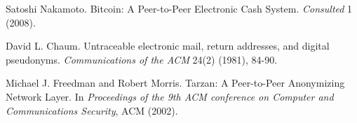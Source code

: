 \documentclass[conference]{IEEEtran}
\begin{document}
\begin{thebibliography}{1}

 Satoshi Nakamoto. Bitcoin: A Peer-to-Peer Electronic Cash System. \emph{Consulted} 1 (2008).

 David L. Chaum. Untraceable electronic mail, return addresses, and digital pseudonyms. \emph{Communications of the ACM} 24(2) (1981), 84-90.

 Michael J. Freedman and Robert Morris. Tarzan: A Peer-to-Peer Anonymizing Network Layer. In \emph{Proceedings of the 9th ACM conference on Computer and Communications Security}, ACM (2002).











\end{thebibliography}
\end{document}
